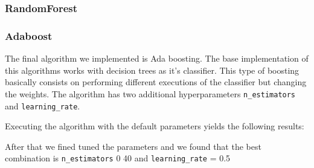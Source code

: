 \pagebreak
\subsubsection{RandomForest}

\subsubsection{Adaboost}

The final algorithm we implemented is Ada boosting. The base implementation of this algorithms works with decision trees as it's classifier. This type of boosting basically consists on performing different executions of the classifier but changing the weights. The algorithm has two additional hyperparameters \texttt{n\_estimators} and \texttt{learning\_rate}.

Executing the algorithm with the default parameters yields the following results:


After that we fined tuned the parameters and we found that the best combination is \texttt{n\_estimators} 0 40 and \texttt{learning\_rate} = 0.5




